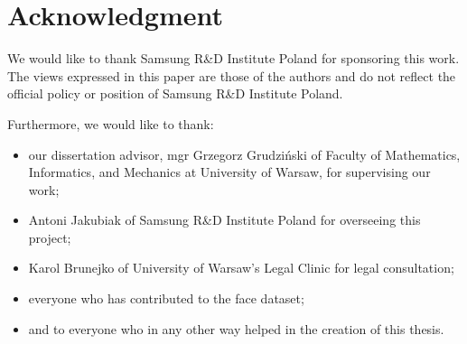 \section*{Acknowledgment}
We would like to thank Samsung R\&D Institute Poland for sponsoring this work.
The views expressed in this paper are those of the authors and do not reflect
the official policy or position of Samsung R\&D Institute Poland.

\bigskip \noindent
Furthermore, we would like to thank:
\begin{itemize}
    \item our dissertation advisor,  mgr Grzegorz Grudziński of Faculty of Mathematics,
          Informatics, and Mechanics at University of Warsaw, for supervising our work;
    \item Antoni Jakubiak of Samsung R\&D Institute Poland for overseeing this project;
    \item Karol Brunejko of University of Warsaw's Legal Clinic for legal consultation;
    \item everyone who has contributed to the face dataset;
    \item and to everyone who in any other way helped in the creation of this thesis.
\end{itemize}
